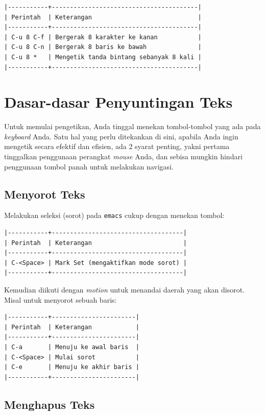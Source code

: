 \documentclass{article}
\begin{document}
\begin{verbatim}
|-----------+----------------------------------------|
| Perintah  | Keterangan                             |
|-----------+----------------------------------------|
| C-u 8 C-f | Bergerak 8 karakter ke kanan           |
| C-u 8 C-n | Bergerak 8 baris ke bawah              |
| C-u 8 *   | Mengetik tanda bintang sebanyak 8 kali |
|-----------+----------------------------------------|
\end{verbatim}

\section{Dasar-dasar Penyuntingan Teks}

Untuk memulai pengetikan, Anda tinggal menekan tombol-tombol yang ada pada
\emph{keyboard} Anda. Satu hal yang perlu ditekankan di sini, apabila Anda 
ingin mengetik secara efektif dan efisien, ada 2 syarat penting, yakni pertama 
tinggalkan penggunaan perangkat \emph{mouse} Anda, dan sebisa mungkin hindari 
penggunaan tombol panah untuk melakukan navigasi.

\subsection{Menyorot Teks}
Melakukan seleksi (sorot) pada \verb=emacs= cukup dengan menekan tombol:

\begin{verbatim}
|-----------+------------------------------------|
| Perintah  | Keterangan                         |
|-----------+------------------------------------|
| C-<Space> | Mark Set (mengaktifkan mode sorot) |
|-----------+------------------------------------|
\end{verbatim}

Kemudian diikuti dengan \emph{motion} untuk menandai daerah yang akan disorot.
Misal untuk menyorot sebuah baris:

\begin{verbatim}
|-----------+-----------------------|
| Perintah  | Keterangan            |
|-----------+-----------------------|
| C-a       | Menuju ke awal baris  |
| C-<Space> | Mulai sorot           |
| C-e       | Menuju ke akhir baris |
|-----------+-----------------------|
\end{verbatim}

\subsection{Menghapus Teks}
\end{document}
